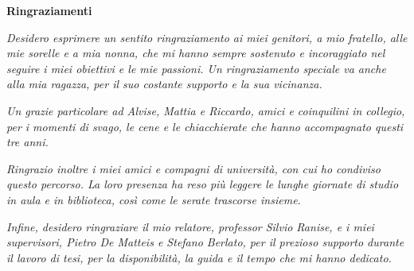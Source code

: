\thispagestyle{empty}

\begin{center}
  {\bf \Huge Ringraziamenti}
\end{center}

\vspace{1.5em}
\noindent
\emph{Desidero esprimere un sentito ringraziamento ai miei genitori, a mio fratello,
alle mie sorelle e a mia nonna, che mi hanno sempre sostenuto e incoraggiato nel
seguire i miei obiettivi e le mie passioni. Un ringraziamento speciale va anche
alla mia ragazza, per il suo costante supporto e la sua vicinanza.}

\vspace{0.5em}

\noindent
\emph{Un grazie particolare ad Alvise, Mattia e Riccardo, amici e coinquilini
in collegio, per i momenti di svago, le cene e le chiacchierate che hanno
accompagnato questi tre anni.}

\vspace{0.5em}

\noindent
\emph{Ringrazio inoltre i miei amici e compagni di università, con cui ho condiviso
questo percorso. La loro presenza ha reso più leggere le lunghe giornate di
studio in aula e in biblioteca, così come le serate trascorse insieme.}

\vspace{0.5em}

\noindent
\emph{Infine, desidero ringraziare il mio relatore, professor Silvio Ranise, e i
miei supervisori, Pietro De Matteis e Stefano Berlato, per il prezioso supporto durante
il lavoro di tesi, per la disponibilità, la guida e il tempo che mi hanno dedicato.}